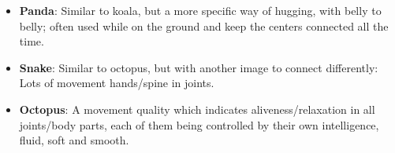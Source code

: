 \begin{itemize}
    \item \textbf{Panda}: Similar to koala, but a more specific way of hugging, with belly to belly; often used while on the ground and keep the centers connected all the time.
    \item \textbf{Snake}: Similar to octopus, but with another image to connect differently: Lots of movement hands/spine in joints.
    \item \textbf{Octopus}: A movement quality which indicates aliveness/relaxation in all joints/body parts, each of them being controlled by their own intelligence, fluid, soft and smooth.
\end{itemize}
